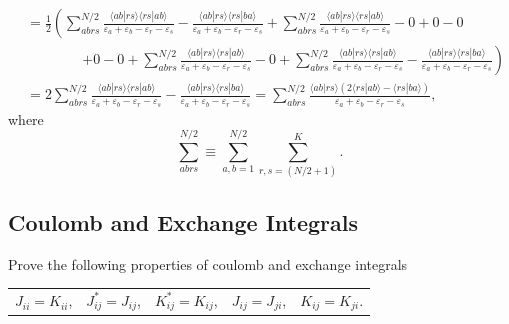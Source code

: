 \documentclass[a4paper]{book}
\newcounter{exercise}[chapter]
\newcounter{solution}[chapter]
\begin{document}
\begin{solution}
\begin{align*}
		&= \frac{1}{2} \left( \sum^{N/2}_{abrs} \frac{ \langle ab | rs \rangle \langle rs | ab \rangle  }{ \varepsilon_a + \varepsilon_b - \varepsilon_r - \varepsilon_s } - \frac{ \langle ab | rs \rangle\langle rs | ba \rangle }{ \varepsilon_a + \varepsilon_b - \varepsilon_r - \varepsilon_s } + \sum^{N/2}_{abrs} \frac{ \langle ab | rs \rangle \langle rs | ab \rangle  }{ \varepsilon_a + \varepsilon_b - \varepsilon_r - \varepsilon_s } - 0 + 0 - 0 \right. \\
		&\hspace{4em} \left. + 0 - 0 + \sum^{N/2}_{abrs} \frac{ \langle ab | rs \rangle \langle rs | ab \rangle  }{ \varepsilon_a + \varepsilon_b - \varepsilon_r - \varepsilon_s } - 0 + \sum^{N/2}_{abrs} \frac{ \langle ab | rs \rangle \langle rs | ab \rangle  }{ \varepsilon_a + \varepsilon_b - \varepsilon_r - \varepsilon_s } - \frac{ \langle ab | rs \rangle \langle rs | ba \rangle }{ \varepsilon_a + \varepsilon_b - \varepsilon_r - \varepsilon_s } \right) \\
		&= 2 \sum^{N/2}_{abrs} \frac{ \langle ab | rs \rangle \langle rs | ab \rangle  }{ \varepsilon_a + \varepsilon_b - \varepsilon_r - \varepsilon_s } - \frac{ \langle ab | rs \rangle \langle rs | ba \rangle }{ \varepsilon_a + \varepsilon_b - \varepsilon_r - \varepsilon_s } = \sum^{N/2}_{abrs} \frac{ \langle ab | rs \rangle ( 2 \langle rs | ab \rangle - \langle rs | ba \rangle ) }{ \varepsilon_a + \varepsilon_b - \varepsilon_r - \varepsilon_s },
	\end{align*}
	where
	\[
		\sum_{abrs}^{N/2} \equiv \sum_{a,b=1}^{N/2} \sum_{r,s=(N/2+1)}^K .
	\]
	
	\end{solution}
	
	\subsection{Coulomb and Exchange Integrals}
	
	\begin{exercise}
	Prove the following properties of coulomb and exchange integrals
	\begin{center}
	\begin{tabular}{ccccc}
		$J_{ii} = K_{ii}$, & $J^*_{ij} = J_{ij}$, &  $K^*_{ij} = K_{ij}$, & $J_{ij} = J_{ji}$, & $K_{ij} = K_{ji}$.
	\end{tabular}
	\end{center}
	\end{exercise}
	
\end{document}
